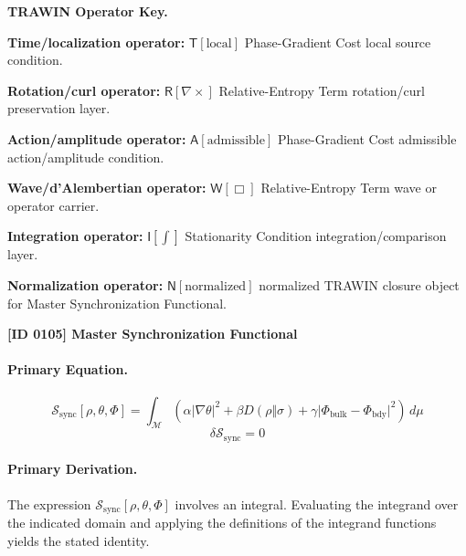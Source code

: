 \par\vspace{0.45\baselineskip}
\noindent\begin{minipage}[t]{\linewidth}
\begingroup
\small
\raggedright
\textbf{TRAWIN Operator Key.}\par
\noindent\textbf{Time/localization operator:} $\mathsf{T}\!\left[\mathrm{local}\right]$ Phase-Gradient Cost local source condition.\par
\noindent\textbf{Rotation/curl operator:} $\mathsf{R}\!\left[\nabla\times\right]$ Relative-Entropy Term rotation/curl preservation layer.\par
\noindent\textbf{Action/amplitude operator:} $\mathsf{A}\!\left[\mathrm{admissible}\right]$ Phase-Gradient Cost admissible action/amplitude condition.\par
\noindent\textbf{Wave/d'Alembertian operator:} $\mathsf{W}\!\left[\Box\right]$ Relative-Entropy Term wave or operator carrier.\par
\noindent\textbf{Integration operator:} $\mathsf{I}\!\left[\int\right]$ Stationarity Condition integration/comparison layer.\par
\noindent\textbf{Normalization operator:} $\mathsf{N}\!\left[\mathrm{normalized}\right]$ normalized TRAWIN closure object for Master Synchronization Functional.\par
\endgroup
\end{minipage}

\clearpage
\noindent\textbf{[ID 0105] Master Synchronization Functional}\par
\vspace{0.35em}
\paragraph{Primary Equation.}
\[
\mathcal{S}_{\mathrm{sync}}[\rho,\theta,\Phi]
=
\int_{\mathcal{M}} \left(
\alpha \lvert \nabla \theta \rvert^2 + \beta D(\rho\Vert\sigma) + \gamma \lvert \Phi_{\mathrm{bulk}}-\Phi_{\mathrm{bdy}}\rvert^2
\right)\, d\mu
\]
\[
\delta \mathcal{S}_{\mathrm{sync}} = 0
\]

\paragraph{Primary Derivation.}
The expression \( \mathcal{S}_{\mathrm{sync}}[\rho,\theta,\Phi] \) involves an integral. Evaluating the integrand over the indicated domain and applying the definitions of the integrand functions yields the stated identity.
